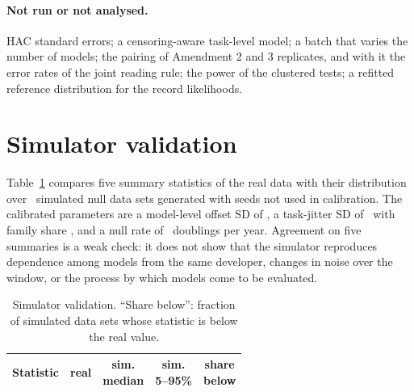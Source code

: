 \documentclass[aps,pre,twocolumn,superscriptaddress,nofootinbib,9pt]{revtex4-2}
\begin{document}
\paragraph*{Not run or not analysed.} HAC standard errors; a censoring-aware task-level model; a batch that varies the number of models; the pairing of Amendment 2 and 3 replicates, and with it the error rates of the joint reading rule; the power of the clustered tests; a refitted reference distribution for the record likelihoods.

\section{Simulator validation}\label{sup:sim}
Table~\ref{tab:simval} compares five summary statistics of the real data with their distribution over \simValN\ simulated null data sets generated with seeds not used in calibration. The calibrated parameters are a model-level offset SD of \sigmaM, a task-jitter SD of \sigmaJ\ with family share \phiFam, and a null rate of \rateNull\ doublings per year. Agreement on five summaries is a weak check: it does not show that the simulator reproduces dependence among models from the same developer, changes in noise over the window, or the process by which models come to be evaluated.

\begin{table}[H]
\caption{Simulator validation. ``Share below'': fraction of simulated data sets whose statistic is below the real value.}
\label{tab:simval}
\begin{ruledtabular}
\begin{tabular}{p{}cccc}
Statistic & real & \shortstack{sim.\\median} & \shortstack{sim.\\5--95\%} & \shortstack{share\\below} \\
\hline

\end{tabular}
\end{ruledtabular}
\end{table}
\end{document}
